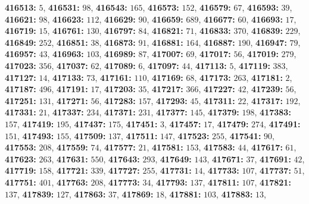 \textsf{\bfseries 416513:} $5$, \textsf{\bfseries 416531:} $98$, \textsf{\bfseries 416543:} $165$, \textsf{\bfseries 416573:} $152$, \textsf{\bfseries 416579:} $67$, \textsf{\bfseries 416593:} $39$, \textsf{\bfseries 416621:} $98$, \textsf{\bfseries 416623:} $112$, \textsf{\bfseries 416629:} $90$, \textsf{\bfseries 416659:} $689$, \textsf{\bfseries 416677:} $60$, \textsf{\bfseries 416693:} $17$, \textsf{\bfseries 416719:} $15$, \textsf{\bfseries 416761:} $130$, \textsf{\bfseries 416797:} $84$, \textsf{\bfseries 416821:} $71$, \textsf{\bfseries 416833:} $370$, \textsf{\bfseries 416839:} $229$, \textsf{\bfseries 416849:} $252$, \textsf{\bfseries 416851:} $38$, \textsf{\bfseries 416873:} $91$, \textsf{\bfseries 416881:} $164$, \textsf{\bfseries 416887:} $190$, \textsf{\bfseries 416947:} $79$, \textsf{\bfseries 416957:} $43$, \textsf{\bfseries 416963:} $103$, \textsf{\bfseries 416989:} $87$, \textsf{\bfseries 417007:} $69$, \textsf{\bfseries 417017:} $56$, \textsf{\bfseries 417019:} $279$, \textsf{\bfseries 417023:} $356$, \textsf{\bfseries 417037:} $62$, \textsf{\bfseries 417089:} $6$, \textsf{\bfseries 417097:} $44$, \textsf{\bfseries 417113:} $5$, \textsf{\bfseries 417119:} $383$, \textsf{\bfseries 417127:} $14$, \textsf{\bfseries 417133:} $73$, \textsf{\bfseries 417161:} $110$, \textsf{\bfseries 417169:} $68$, \textsf{\bfseries 417173:} $263$, \textsf{\bfseries 417181:} $2$, \textsf{\bfseries 417187:} $496$, \textsf{\bfseries 417191:} $17$, \textsf{\bfseries 417203:} $35$, \textsf{\bfseries 417217:} $366$, \textsf{\bfseries 417227:} $42$, \textsf{\bfseries 417239:} $56$, \textsf{\bfseries 417251:} $131$, \textsf{\bfseries 417271:} $56$, \textsf{\bfseries 417283:} $157$, \textsf{\bfseries 417293:} $45$, \textsf{\bfseries 417311:} $22$, \textsf{\bfseries 417317:} $192$, \textsf{\bfseries 417331:} $21$, \textsf{\bfseries 417337:} $234$, \textsf{\bfseries 417371:} $231$, \textsf{\bfseries 417377:} $145$, \textsf{\bfseries 417379:} $198$, \textsf{\bfseries 417383:} $157$, \textsf{\bfseries 417419:} $195$, \textsf{\bfseries 417437:} $175$, \textsf{\bfseries 417451:} $3$, \textsf{\bfseries 417457:} $17$, \textsf{\bfseries 417479:} $274$, \textsf{\bfseries 417491:} $151$, \textsf{\bfseries 417493:} $155$, \textsf{\bfseries 417509:} $137$, \textsf{\bfseries 417511:} $147$, \textsf{\bfseries 417523:} $255$, \textsf{\bfseries 417541:} $90$, \textsf{\bfseries 417553:} $208$, \textsf{\bfseries 417559:} $74$, \textsf{\bfseries 417577:} $21$, \textsf{\bfseries 417581:} $153$, \textsf{\bfseries 417583:} $44$, \textsf{\bfseries 417617:} $61$, \textsf{\bfseries 417623:} $263$, \textsf{\bfseries 417631:} $550$, \textsf{\bfseries 417643:} $293$, \textsf{\bfseries 417649:} $143$, \textsf{\bfseries 417671:} $37$, \textsf{\bfseries 417691:} $42$, \textsf{\bfseries 417719:} $158$, \textsf{\bfseries 417721:} $339$, \textsf{\bfseries 417727:} $255$, \textsf{\bfseries 417731:} $14$, \textsf{\bfseries 417733:} $107$, \textsf{\bfseries 417737:} $51$, \textsf{\bfseries 417751:} $401$, \textsf{\bfseries 417763:} $208$, \textsf{\bfseries 417773:} $34$, \textsf{\bfseries 417793:} $137$, \textsf{\bfseries 417811:} $107$, \textsf{\bfseries 417821:} $137$, \textsf{\bfseries 417839:} $127$, \textsf{\bfseries 417863:} $37$, \textsf{\bfseries 417869:} $18$, \textsf{\bfseries 417881:} $103$, \textsf{\bfseries 417883:} $13$, 

